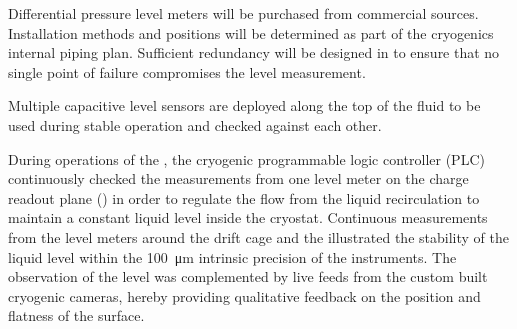 Differential pressure level meters will be purchased from commercial sources.
Installation methods and positions will be determined as part of the
cryogenics internal piping plan.  Sufficient redundancy will be designed in
to ensure that no single point of failure compromises the level measurement.

Multiple capacitive level sensors are deployed along the top of
the fluid to be used during stable operation and checked against each
other.

During operations of the , the cryogenic programmable logic controller (PLC) continuously checked the measurements from one level meter on the charge readout plane () in order to regulate the flow from the liquid recirculation to maintain a constant liquid level inside the cryostat. Continuous measurements from the level meters around the drift cage and the  illustrated the stability of the liquid level within the \SI{100}{\micro\meter} intrinsic precision of the instruments. The observation of the level was complemented by live feeds from the custom built cryogenic cameras, hereby providing qualitative feedback on the position and flatness of the surface.

 
